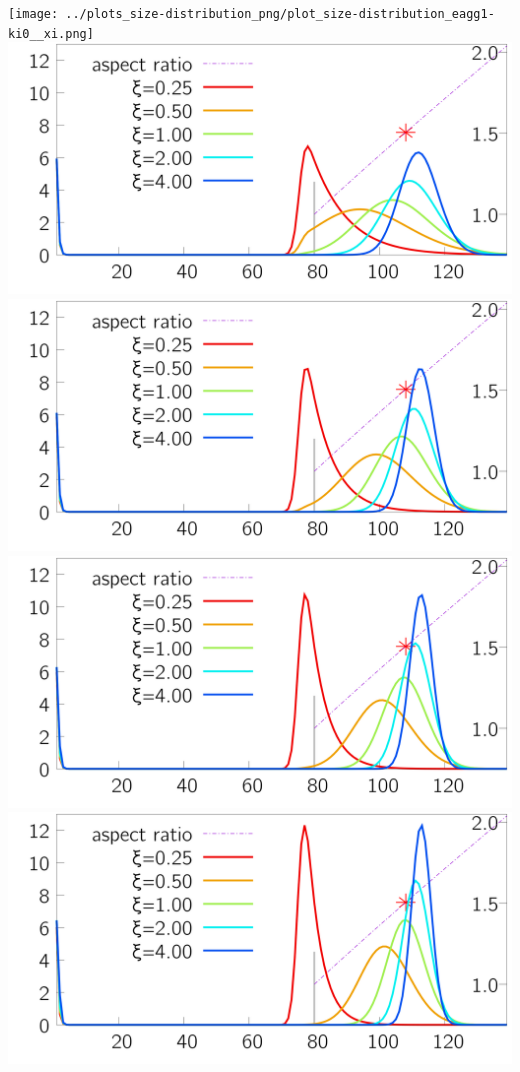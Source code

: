 \begin{minipage}{0.25\textwidth} 
 \texttt{[image: ../plots\_size-distribution\_png/plot\_size-distribution\_eagg1-ki0\_\_xi.png]}
\includegraphics[width=\textwidth ]{../plots_size-distribution_png/plot_size-distribution_eagg1-ki1__xi.png}
\includegraphics[width=\textwidth ]{../plots_size-distribution_png/plot_size-distribution_eagg1-ki2__xi.png}
\includegraphics[width=\textwidth ]{../plots_size-distribution_png/plot_size-distribution_eagg1-ki3__xi.png}
\includegraphics[width=\textwidth ]{../plots_size-distribution_png/plot_size-distribution_eagg1-ki4__xi.png}
\end{minipage}%
